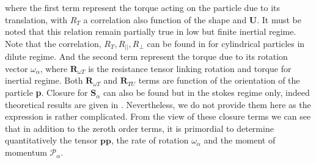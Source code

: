 where the first term represent the torque acting on the particle due to its translation,
with $R_T$ a correlation also function of the shape and $\textbf{U}$.
It must be noted that this relation remain partially true in low but finite inertial regime. 
Note that the correlation,  $R_T, R_{||} , R_{\bot}$ can be found in \citet{fintzi2023inertial} for cylindrical particles in dilute regime. 
And the second term represent the torque due to its rotation vector $\omega_\alpha$, where $\textbf{R}_{\omega T}$ is the resistance tensor linking rotation and torque \citet{pierson2021hydrodynamic} for inertial regime.  
Both $\textbf{R}_{\omega T}$ and $\textbf{R}_{TU}$ terms are function of the orientation of the particle \textbf{p}.
Closure for $\textbf{S}_\alpha$ can also be found but in the stokes regime only, 
indeed theoretical results are given in \citet[p 62]{kim2013microhydrodynamics}. Nevertheless, we do not provide them here as the expression is rather complicated. 
From the view of these closure terms we can see that in addition to the zeroth order terms, it is primordial to determine quantitatively the tensor $\textbf{pp}$, the rate of rotation $\omega_\alpha$ and the moment of momentum $\mathcal{P}_\alpha$. 

